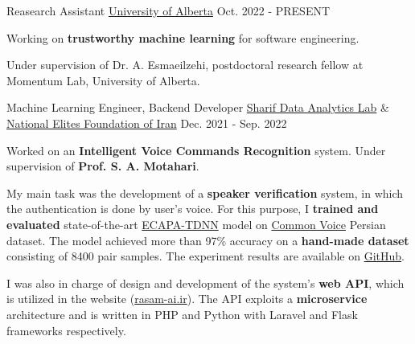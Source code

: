 

\begin{cventries}

  \cventry
    {Reasearch Assistant} %
    {\href{https://www.ualberta.ca/index.html}{University of Alberta}} %
    {} %
    {Oct. 2022 - PRESENT} %
    {
      \begin{cvitems} %
        \item {Working on \textbf{trustworthy machine learning} for software engineering.}
        \item {Under supervision of Dr. A. Esmaeilzehi, postdoctoral research fellow at Momentum Lab, University of Alberta.}
      \end{cvitems}
    }

  \cventry
    {Machine Learning Engineer, Backend Developer} %
    {\href{https://www.sharif.edu/}{Sharif Data Analytics Lab} \& \href{https://en.bmn.ir/}{National Elites Foundation of Iran}} %
    {} %
    {Dec. 2021 - Sep. 2022} %
    {
      \begin{cvitems} %
        \item {Worked on an \textbf{Intelligent Voice Commands Recognition} system. Under supervision of \textbf{Prof. S. A. Motahari}.}
        \item {My main task was the development of a \textbf{speaker verification} system, in which the authentication is done by user's voice. For this purpose, I \textbf{trained and evaluated} state-of-the-art \href{https://arxiv.org/abs/2005.07143}{ECAPA-TDNN} model on \href{https://commonvoice.mozilla.org}{Common Voice} Persian dataset. The model achieved more than 97\% accuracy on a \textbf{hand-made dataset} consisting of 8400 pair samples. The experiment results are available on \href{https://github.com/radinshayanfar/speaker-verification}{GitHub}.}
        \item{I was also in charge of design and development of the system's \textbf{web API}, which is utilized in the website (\href{https://rasam-ai.ir/}{rasam-ai.ir}). The API exploits a \textbf{microservice} architecture and is written in PHP and Python with Laravel and Flask frameworks respectively.}
      \end{cvitems}
    }


\end{cventries}
